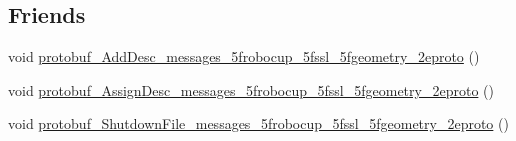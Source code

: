 \subsection*{Friends}
\begin{DoxyCompactItemize}
\item 
void \hyperlink{class_s_s_l___geometry_camera_calibration_a7d99889adee2c69f6bdd945449284431}{protobuf\-\_\-\-Add\-Desc\-\_\-messages\-\_\-5frobocup\-\_\-5fssl\-\_\-5fgeometry\-\_\-2eproto} ()
\item 
void \hyperlink{class_s_s_l___geometry_camera_calibration_a1fc037efb8fe2bb0942e88857a9baf62}{protobuf\-\_\-\-Assign\-Desc\-\_\-messages\-\_\-5frobocup\-\_\-5fssl\-\_\-5fgeometry\-\_\-2eproto} ()
\item 
void \hyperlink{class_s_s_l___geometry_camera_calibration_ac3ccd1382cfb3dfd4eb3eb85981705c6}{protobuf\-\_\-\-Shutdown\-File\-\_\-messages\-\_\-5frobocup\-\_\-5fssl\-\_\-5fgeometry\-\_\-2eproto} ()
\end{DoxyCompactItemize}


